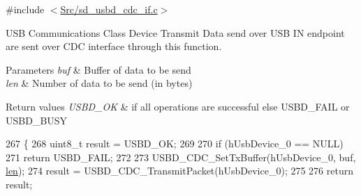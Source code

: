 {\ttfamily \#include $<$\mbox{\hyperlink{sd__usbd__cdc__if_8c}{Src/sd\+\_\+usbd\+\_\+cdc\+\_\+if.\+c}}$>$}



U\+SB Communications Class Device Transmit Data send over U\+SB IN endpoint are sent over C\+DC interface through this function. 


\begin{DoxyParams}{Parameters}
{\em buf} & Buffer of data to be send \\
\hline
{\em len} & Number of data to be send (in bytes) \\
\hline
\end{DoxyParams}

\begin{DoxyRetVals}{Return values}
{\em U\+S\+B\+D\+\_\+\+OK} & if all operations are successful else U\+S\+B\+D\+\_\+\+F\+A\+IL or U\+S\+B\+D\+\_\+\+B\+U\+SY \\
\hline
\end{DoxyRetVals}

\begin{DoxyCode}
267 \{
268     uint8\_t result = USBD\_OK;
269     
270     \textcolor{keywordflow}{if} (hUsbDevice\_0 == NULL) 
271         \textcolor{keywordflow}{return} USBD\_FAIL;
272   
273     USBD\_CDC\_SetTxBuffer(hUsbDevice\_0, buf, \mbox{\hyperlink{structsd__cbuf_a96bbf959016e4411c9e6b9812a8be60a}{len}});   
274     result = USBD\_CDC\_TransmitPacket(hUsbDevice\_0);
275     
276     \textcolor{keywordflow}{return} result;
\end{DoxyCode}
